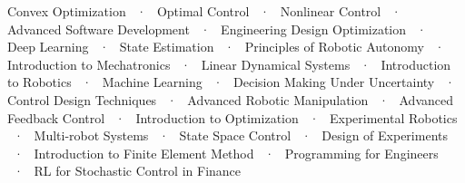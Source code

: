 

\begin{cvparagraph}

Convex Optimization ~·~ Optimal Control ~·~ Nonlinear Control ~·~ Advanced Software Development ~·~ Engineering Design Optimization ~·~ Deep Learning ~·~ State Estimation ~·~ Principles of Robotic Autonomy ~·~ Introduction to Mechatronics ~·~ Linear Dynamical Systems ~·~ Introduction to Robotics ~·~ Machine Learning ~·~ Decision Making Under Uncertainty ~·~ Control Design Techniques ~·~ Advanced Robotic Manipulation ~·~ Advanced Feedback Control ~·~ Introduction to Optimization ~·~ Experimental Robotics ~·~ Multi-robot Systems ~·~ State Space Control ~·~ Design of Experiments ~·~ Introduction to Finite Element Method ~·~ Programming for Engineers ~·~ RL for Stochastic Control in Finance
\end{cvparagraph}
